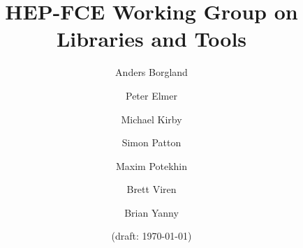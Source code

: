 \title{HEP-FCE Working Group on Libraries and Tools}

\author{Anders Borgland}

\author{Peter Elmer}

\author{Michael Kirby}

\author{Simon Patton}

\author{Maxim Potekhin}

\author{Brett Viren}

\author{Brian Yanny}


\date{(draft: \today)}          %
\maketitle

